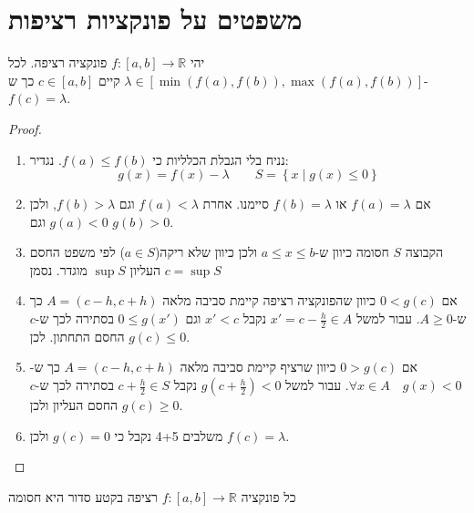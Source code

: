 \documentclass{tstextbook}
\begin{document}
\section{משפטים על פונקציות רציפות}

\begin{theorem}
יהי \(f:[a,b]\to \mathbb{R}\) פונקציה רציפה. לכל \(\lambda \in \left[ \min(f(a),f(b)),\max(f(a),f(b)) \right]\) קיים \(c \in [a,b]\) כך ש-\(f(c)=\lambda\).

\end{theorem}
\begin{proof}
  \begin{enumerate}
    \item נניח בלי הגבלת הכלליות כי \(f(a)\leq f(b)\). נגדיר: 
$$g(x)=f(x)-\lambda \qquad S=\left\{  x\mid g(x)\leq 0  \right\}$$


    \item אם \(f(a)=\lambda\) או \(f(b)=\lambda\) סיימנו. אחרת \(f(a)<\lambda\) וגם \(f(b)>\lambda\), ולכן \(g(a)<0\) וגם \(g(b)>0\). 


    \item הקבוצה \(S\) חסומה כיוון ש-\(a\leq x \leq b\) ולכן כיוון שלא ריקה(\(a \in S\)) לפי משפט החסם העליון \(\sup S\) מוגדר. נסמן \(c=\sup S\)


    \item אם \(0<g(c)\) כיוון שהפונקציה רציפה קיימת סביבה מלאה \(A=(c-h,c+h)\) כך ש-\(A\geq 0\). עבור למשל \(x' = c- \frac{h}{2}\in A\) נקבל \(x'< c\) וגם \(0\leq g(x')\) בסתירה לכך ש-\(c\) החסם התחתון. לכן \(g(c)\leq 0\). 


    \item אם \(0> g(c)\) כיוון שרציף קיימת סביבה מלאה \(A=(c-h,c+h)\) כך ש-\(\forall x \in A\quad g(x)<0\). עבור למשל \(g\left( c+\frac{h}{2} \right)<0\) נקבל \(c+\frac{h}{2}\in S\) בסתירה לכך ש-\(c\) החסם העליון ולכן \(g(c)\geq 0\). 


    \item משלבים 4+5 נקבל כי \(g(c)=0\) ולכן \(f(c)=\lambda\). 


  \end{enumerate}
\end{proof}
\begin{theorem}
כל פונקציה \(f:[a,b]\to \mathbb{R}\) רציפה בקטע סדור היא חסומה

\end{theorem}
\end{document}
